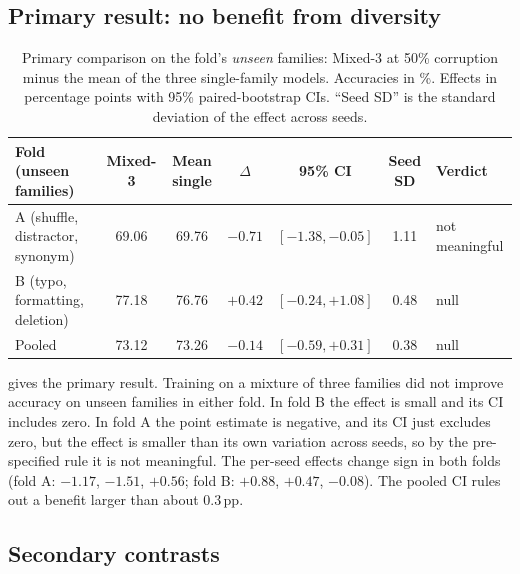 \documentclass[11pt]{article}
\newcommand{\ppts}{\,pp}
\newcommand{\pfam}[1]{\textsf{#1}}
\begin{document}
\subsection{Primary result: no benefit from diversity}
\label{sec:primary}

\begin{table}[t]
\centering
\small
\caption{Primary comparison on the fold's \emph{unseen} families: Mixed-3 at 50\% corruption minus the mean of the three single-family models. Accuracies in \%. Effects in percentage points with 95\% paired-bootstrap CIs. ``Seed SD'' is the standard deviation of the effect across seeds.}
\label{tab:primary}
\begin{tabular}{@{}lccccc l@{}}
\toprule
Fold (unseen families) & Mixed-3 & Mean single & $\Delta$ & 95\% CI & Seed SD & Verdict \\
\midrule
A (\pfam{shuffle}, \pfam{distractor}, \pfam{synonym}) & 69.06 & 69.76 & $-0.71$ & $[-1.38, -0.05]$ & 1.11 & not meaningful \\
B (\pfam{typo}, \pfam{formatting}, \pfam{deletion}) & 77.18 & 76.76 & $+0.42$ & $[-0.24, +1.08]$ & 0.48 & null \\
Pooled & 73.12 & 73.26 & $-0.14$ & $[-0.59, +0.31]$ & 0.38 & null \\
\bottomrule
\end{tabular}
\end{table}

 gives the primary result. Training on a mixture of three families did not improve accuracy on unseen families in either fold. In fold B the effect is small and its CI includes zero. In fold A the point estimate is negative, and its CI just excludes zero, but the effect is smaller than its own variation across seeds, so by the pre-specified rule it is not meaningful. The per-seed effects change sign in both folds (fold A: $-1.17$, $-1.51$, $+0.56$; fold B: $+0.88$, $+0.47$, $-0.08$). The pooled CI rules out a benefit larger than about $0.3$\ppts{}.

\subsection{Secondary contrasts}
\label{sec:secondary}
\end{document}
